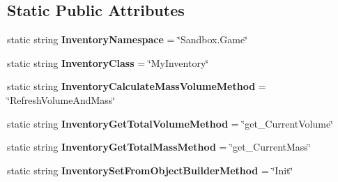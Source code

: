 \subsection*{Static Public Attributes}
\begin{DoxyCompactItemize}
\item 
\hypertarget{class_s_e_mod_a_p_i_internal_1_1_a_p_i_1_1_entity_1_1_inventory_entity_a40efe81adf1ed9da3d287b4d98168cdf}{}static string {\bfseries Inventory\+Namespace} = \char`\"{}Sandbox.\+Game\char`\"{}\label{class_s_e_mod_a_p_i_internal_1_1_a_p_i_1_1_entity_1_1_inventory_entity_a40efe81adf1ed9da3d287b4d98168cdf}

\item 
\hypertarget{class_s_e_mod_a_p_i_internal_1_1_a_p_i_1_1_entity_1_1_inventory_entity_a9241b640a8a0af71df75a99963838211}{}static string {\bfseries Inventory\+Class} = \char`\"{}My\+Inventory\char`\"{}\label{class_s_e_mod_a_p_i_internal_1_1_a_p_i_1_1_entity_1_1_inventory_entity_a9241b640a8a0af71df75a99963838211}

\item 
\hypertarget{class_s_e_mod_a_p_i_internal_1_1_a_p_i_1_1_entity_1_1_inventory_entity_aea5c570cb30cbcc14d9000bb7969ad4e}{}static string {\bfseries Inventory\+Calculate\+Mass\+Volume\+Method} = \char`\"{}Refresh\+Volume\+And\+Mass\char`\"{}\label{class_s_e_mod_a_p_i_internal_1_1_a_p_i_1_1_entity_1_1_inventory_entity_aea5c570cb30cbcc14d9000bb7969ad4e}

\item 
\hypertarget{class_s_e_mod_a_p_i_internal_1_1_a_p_i_1_1_entity_1_1_inventory_entity_ae5db86850f62a73dddbf69550e85a4b3}{}static string {\bfseries Inventory\+Get\+Total\+Volume\+Method} = \char`\"{}get\+\_\+\+Current\+Volume\char`\"{}\label{class_s_e_mod_a_p_i_internal_1_1_a_p_i_1_1_entity_1_1_inventory_entity_ae5db86850f62a73dddbf69550e85a4b3}

\item 
\hypertarget{class_s_e_mod_a_p_i_internal_1_1_a_p_i_1_1_entity_1_1_inventory_entity_a4caaecdd5934ea40e83b8ff00c3d2445}{}static string {\bfseries Inventory\+Get\+Total\+Mass\+Method} = \char`\"{}get\+\_\+\+Current\+Mass\char`\"{}\label{class_s_e_mod_a_p_i_internal_1_1_a_p_i_1_1_entity_1_1_inventory_entity_a4caaecdd5934ea40e83b8ff00c3d2445}

\item 
\hypertarget{class_s_e_mod_a_p_i_internal_1_1_a_p_i_1_1_entity_1_1_inventory_entity_aef55a5d6fbb6050862c343fb39b9d6b9}{}static string {\bfseries Inventory\+Set\+From\+Object\+Builder\+Method} = \char`\"{}Init\char`\"{}\label{class_s_e_mod_a_p_i_internal_1_1_a_p_i_1_1_entity_1_1_inventory_entity_aef55a5d6fbb6050862c343fb39b9d6b9}


\end{DoxyCompactItemize}
